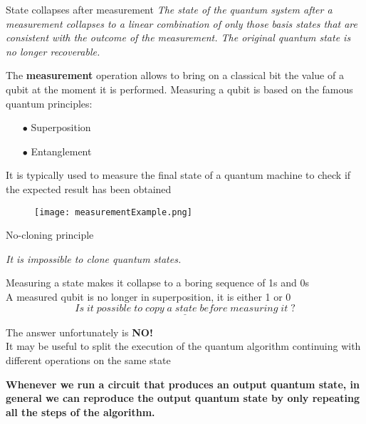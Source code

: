 		\begin{frame}{State collapses after measurement}
			\small
			\emph{The state of the quantum system after a measurement collapses to a linear combination of only those basis states that are consistent with the outcome of the measurement. The original quantum state is no longer recoverable.}
			
			\vspace{0.3cm}
			
			\begin{minipage}{0.6\textwidth}
				The \textbf{measurement} operation allows to bring on a classical bit the value of a qubit at the moment it is performed. Measuring a qubit is based on the famous quantum principles:
				\begin{itemize}
					\item[$\bullet$] Superposition
					\item[$\bullet$] Entanglement
				\end{itemize}
				It is typically used to measure the final state of a quantum machine to check if the expected result has been obtained
			\end{minipage}\hfill
			\begin{minipage}{0.4\textwidth}
				\centering
				\begin{figure}[h]
					\hspace{0.4cm}
					\texttt{[image: measurementExample.png]}
				\end{figure}
			\end{minipage}
		\end{frame}
	
		\begin{frame}{No-cloning principle}
			\small
			\begin{center}
				\vspace{-1cm}
				\emph{It is impossible to clone quantum states.}
			\end{center}
		
			\vspace{0.3cm}
		
			Measuring a state makes it collapse to a boring sequence of 1s and 0s\\
			A measured qubit is no longer in superposition, it is either 1 or 0 \\
			\begin{equation*}
				\underline{Is\;it\;possible\;to\;copy\;a\;state\;before\;measuring\;it\;?}
			\end{equation*}
			
			\vspace{0.3cm}
			
			The answer unfortunately is \textbf{NO!}\\
			It may be useful to split the execution of the quantum algorithm continuing with different operations on the same state
			
			\vspace{0.3cm}
			
			\textbf{Whenever we run a circuit that produces an output quantum state, in general we can reproduce the output quantum state by only repeating all the steps of the algorithm.}
		\end{frame}
	
